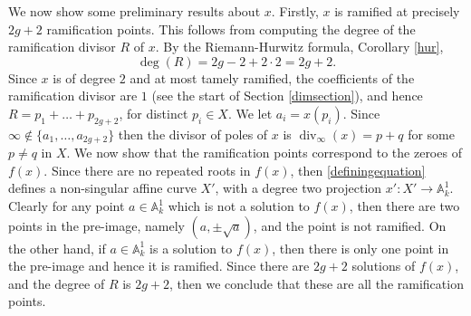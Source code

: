 \documentclass[11pt]{article} %
\theoremstyle{plain}
\theoremstyle{remark}
\DeclareMathOperator{\di}{div}
\begin{document}
We now show some preliminary results about $x$. 
Firstly, $x$ is ramified at precisely $2g + 2$ ramification points.
This follows from computing the degree of the ramification divisor $R$ of $x$.
By the Riemann-Hurwitz formula, Corollary \ref{hur},
\[ 
\deg(R) = 2g -2 +2\cdot 2 = 2g + 2.
\]
Since $x$ is of degree $2$ and at most tamely ramified, the coefficients of the ramification divisor are $1$ (see the start of Section \ref{dimsection}), and hence $R = p_1 + \ldots + p_{2g+2}$, for distinct $p_i\in X$.
We let $a_i = x(p_i)$.
Since $\infty \notin \{a_1,\ldots ,a_{2g+2}\}$ then the divisor of poles of $x$ is $\di_{\infty}(x) = p + q$ for some $p \neq q $ in $X$.
We now show that the ramification points correspond to the zeroes of $f(x)$.
Since there are no repeated roots in $f(x)$, then \eqref{definingequation} defines a non-singular affine curve $X'$, with a degree two projection $x': X'\rightarrow \mathbb A_k^1$.
Clearly for any point $a\in \mathbb A_k^1$ which is not a solution to $f(x)$, then there are two points in the pre-image, namely $(a,\pm \sqrt{a})$, and the point is not ramified.
On the other hand, if $a\in \mathbb A_k^1$ is a solution to $f(x)$, then there is only one point in the pre-image and hence it is ramified.
Since there are $2g+2$ solutions of $f(x)$, and the degree of $R$ is $2g+2$, then we conclude that these are all the ramification points.
\end{document}
